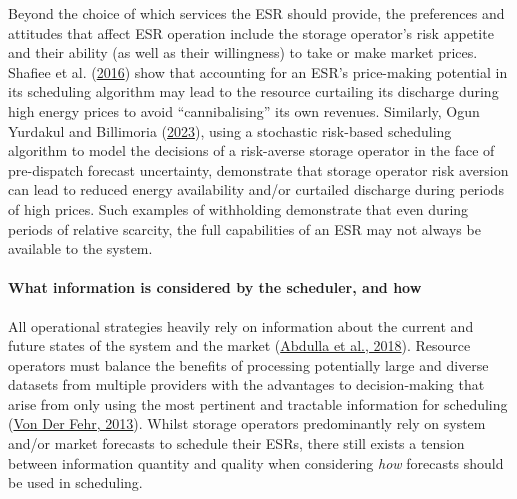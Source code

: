 \documentclass[12pt,a4paper,]{report}
\begin{document}
Beyond the choice of which services the ESR should provide, the
preferences and attitudes that affect ESR operation include the storage
operator's risk appetite and their ability (as well as their
willingness) to take or make market prices. Shafiee et al.
(\protect\hyperlink{ref-shafieeEconomicAssessmentPricemaker2016}{2016})
show that accounting for an ESR's price-making potential in its
scheduling algorithm may lead to the resource curtailing its discharge
during high energy prices to avoid ``cannibalising'' its own revenues.
Similarly, Ogun Yurdakul and Billimoria
(\protect\hyperlink{ref-yurdakulRiskAverseSelfSchedulingStorage2023}{2023}),
using a stochastic risk-based scheduling algorithm to model the
decisions of a risk-averse storage operator in the face of pre-dispatch
forecast uncertainty, demonstrate that storage operator risk aversion
can lead to reduced energy availability and/or curtailed discharge
during periods of high prices. Such examples of withholding demonstrate
that even during periods of relative scarcity, the full capabilities of
an ESR may not always be available to the system.

\hypertarget{sec:info-context-esr-operation-information}{%
\paragraph{What information is considered by the scheduler, and
how}\label{sec:info-context-esr-operation-information}}

All operational strategies heavily rely on information about the current
and future states of the system and the market
(\protect\hyperlink{ref-abdullaOptimalOperationEnergy2018}{Abdulla et
al., 2018}). Resource operators must balance the benefits of processing
potentially large and diverse datasets from multiple providers with the
advantages to decision-making that arise from only using the most
pertinent and tractable information for scheduling
(\protect\hyperlink{ref-vonderfehrTransparencyElectricityMarkets2013}{Von
Der Fehr, 2013}). Whilst storage operators predominantly rely on system
and/or market forecasts to schedule their ESRs, there still exists a
tension between information quantity and quality when considering
\emph{how} forecasts should be used in scheduling.
\end{document}
